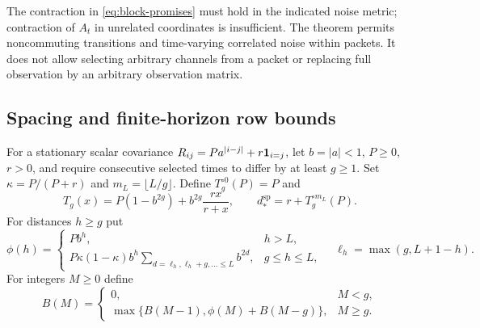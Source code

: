 The contraction in \eqref{eq:block-promises} must hold in the indicated
noise metric; contraction of $A_t$ in unrelated coordinates is insufficient.
The theorem permits noncommuting transitions and time-varying correlated
noise within packets. It does not allow selecting arbitrary channels from a
packet or replacing full observation by an arbitrary observation matrix.

\subsection{Spacing and finite-horizon row bounds}
\label{subsec:spacing-locality}
For a stationary scalar covariance
$R_{ij}=Pa^{|i-j|}+r\mathbf 1_{i=j}$, let $b=|a|<1$, $P\ge0$, $r>0$, and
require consecutive selected times to differ by at least $g\ge1$.
Set $\kappa=P/(P+r)$ and $m_L=\lfloor L/g\rfloor$.
Define $T_g^{\circ0}(P)=P$ and
\begin{equation}
 T_g(x)=P(1-b^{2g})+b^{2g}\frac{rx}{r+x},\qquad
 d_*^{\mathrm{sp}}=r+T_g^{\circ m_L}(P).
 \label{eq:spacing-floor}
\end{equation}
For distances $h\ge g$ put
\begin{equation}
 \phi(h)=\begin{cases}
 P b^h,&h>L,\\
 P\kappa(1-\kappa)b^h
 \displaystyle\sum_{d=\ell_h,\ell_h+g,\ldots\le L} b^{2d},&g\le h\le L,
 \end{cases}\quad \ell_h=\max(g,L+1-h).
 \label{eq:spacing-pair-majorant}
\end{equation}
For integers $M\ge0$ define
\begin{equation}
 B(M)=\begin{cases}0,&M<g,\\
 \max\{B(M-1),\phi(M)+B(M-g)\},&M\ge g.
 \end{cases}
 \label{eq:spacing-row-dp}
\end{equation}

